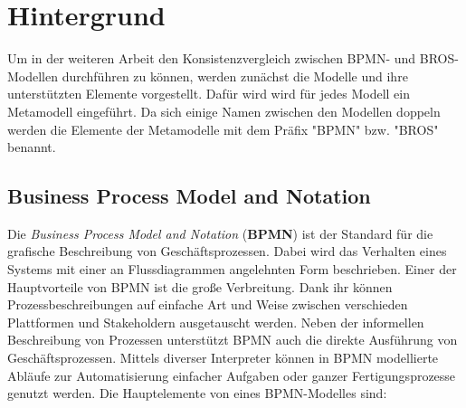 \chapter{Hintergrund}
\label{chap:background}

Um in der weiteren Arbeit den Konsistenzvergleich zwischen BPMN- und BROS-Modellen durchführen zu können, werden zunächst die Modelle und ihre unterstützten Elemente vorgestellt.
Dafür wird wird für jedes Modell ein Metamodell eingeführt.
Da sich einige Namen zwischen den Modellen doppeln werden die Elemente der Metamodelle mit dem Präfix "BPMN" bzw. "BROS" benannt.

\section{Business Process Model and Notation}

Die \emph{Business Process Model and Notation} (\textbf{BPMN}) ist der Standard für die grafische Beschreibung von Geschäftsprozessen.
Dabei wird das Verhalten eines Systems mit einer an Flussdiagrammen angelehnten Form beschrieben.
Einer der Hauptvorteile von BPMN ist die große Verbreitung.
Dank ihr können Prozessbeschreibungen auf einfache Art und Weise zwischen verschieden Plattformen und Stakeholdern ausgetauscht werden.
Neben der informellen Beschreibung von Prozessen unterstützt BPMN auch die direkte Ausführung von Geschäftsprozessen.
Mittels diverser Interpreter können in BPMN modellierte Abläufe zur Automatisierung einfacher Aufgaben oder ganzer Fertigungsprozesse genutzt werden.
Die Hauptelemente von eines BPMN-Modelles sind:

